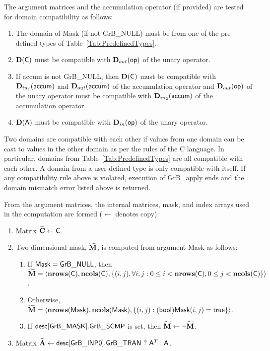 The argument matrices and the accumulation 
operator (if provided) are tested for domain compatibility as follows:
\begin{enumerate}
	\item The domain of {\sf Mask} (if not {\sf GrB\_NULL}) must be from one of
    the pre-defined types of Table~\ref{Tab:PredefinedTypes}.

	\item $\bold{D}({\sf C})$ must be
    compatible with $\mbox{$\mathbf{D}_{out}$}({\sf op})$ of the unary operator.

	\item If {\sf accum} is not {\sf GrB\_NULL}, then $\bold{D}({\sf C})$ must be
    compatible with $\mbox{$\mathbf{D}_{in_{1}}$}({\sf accum})$ and $\mbox{$\mathbf{D}_{out}$}({\sf accum})$ of the accumulation operator and 
    $\mbox{$\mathbf{D}_{out}$}({\sf op})$ of the unary operator must be compatible with $\mbox{$\mathbf{D}_{in_{2}}$}({\sf accum})$ of the accumulation operator.

	\item $\bold{D}({\sf A})$ must be compatible with $\mbox{$\mathbf{D}_{in}$}({\sf op})$ of the unary operator.
\end{enumerate}
Two domains are compatible with each other if values from one domain can be cast 
to values in the other domain as per the rules of the C language.
In particular, domains from Table~\ref{Tab:PredefinedTypes} are all compatible 
with each other. A domain from a user-defined type is only compatible with itself.
If any compatibility rule above is violated, execution of {\sf GrB\_apply} ends and 
the domain mismatch error listed above is returned.

From the argument matrices, the internal matrices, mask, and index arrays used in 
the computation are formed ($\leftarrow$ denotes copy):
\begin{enumerate}
	\item Matrix ${\bf \widetilde{C}} \leftarrow {\sf C}$.

	\item Two-dimensional mask, ${\bf \widetilde{M}}$, is computed from 
    argument {\sf Mask} as follows:
	\begin{enumerate}
		\item	If ${\sf Mask} = {\sf GrB\_NULL}$, then ${\bf \widetilde{M}} = 
        \langle \bold{nrows}({\sf C}), \bold{ncols}({\sf C}), \{(i,j), 
        \forall i,j : 0 \leq i <  \bold{nrows}({\sf C}), 0 \leq j < 
        \bold{ncols}({\sf C}) \} \rangle$.

		\item	Otherwise, ${\bf \widetilde{M}} = \langle \bold{nrows}({\sf Mask}), 
        \bold{ncols}({\sf Mask}), \{(i,j) : 
        ({\sf bool}){\sf Mask}(i,j) = {\sf true}\} \rangle$.

		\item	If ${\sf desc[GrB\_MASK].GrB\_SCMP}$ is set, then 
        ${\bf \widetilde{M}} \leftarrow \neg {\bf \widetilde{M}}$.
	\end{enumerate}

	\item Matrix ${\bf \widetilde{A}} \leftarrow
    {\sf desc[GrB\_INP0].GrB\_TRAN} \ ? \ {\sf A}^T : {\sf A}$.
    
\end{enumerate}

